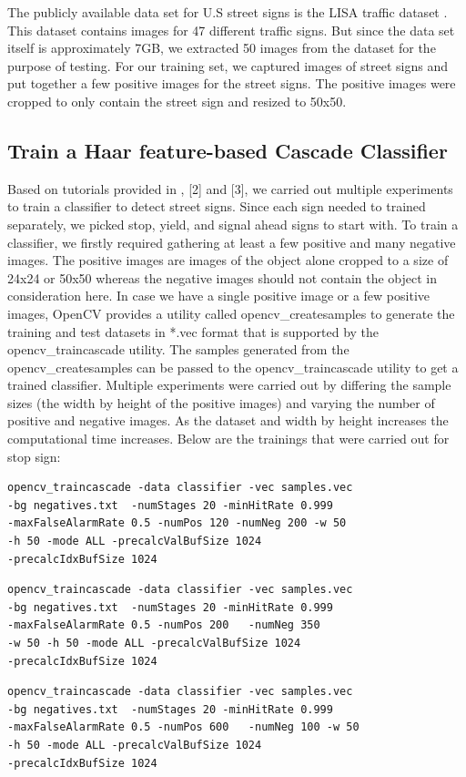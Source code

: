 \documentclass[9pt,twocolumn,twoside]{../../styles/osajnl}
\begin{document}
The publicly available data set for U.S street signs is the LISA traffic dataset \cite{paper-lisadataset}. This dataset contains images for 47 different traffic signs. But since the data set itself is approximately 7GB, we extracted 50 images from the dataset for the purpose of testing. For our training set, we captured images of street signs and put together a few positive images for the street signs. The positive images were cropped to only contain the street sign and resized to 50x50.

\subsection{Train a Haar feature-based Cascade Classifier}

Based on tutorials provided in \cite{www-coding-robin}, [2] and [3], we carried out multiple experiments to train a classifier to detect street signs. Since each sign needed to trained separately, we picked stop, yield, and signal ahead signs to start with. To train a classifier, we firstly required gathering at least a few positive and many negative images. The positive images are images of the object alone cropped to a size of 24x24 or 50x50 whereas the negative images should not contain the object in consideration here. In case we have a single positive image or a few positive images, OpenCV provides a utility called opencv\_createsamples to generate the training and test datasets in *.vec format that is supported by the opencv\_traincascade utility. The samples generated from the opencv\_createsamples can be passed to the opencv\_traincascade utility to get a trained classifier.   
Multiple experiments were carried out by differing the sample sizes (the width by height of the positive images) and varying the number of positive and negative images. As the dataset and width by height increases the computational time increases. Below are the trainings that were carried out for stop sign:

\begin{verbatim}
opencv_traincascade -data classifier -vec samples.vec 
-bg negatives.txt  -numStages 20 -minHitRate 0.999 
-maxFalseAlarmRate 0.5 -numPos 120 -numNeg 200 -w 50
-h 50 -mode ALL -precalcValBufSize 1024
-precalcIdxBufSize 1024
\end{verbatim}
\begin{verbatim}
opencv_traincascade -data classifier -vec samples.vec 
-bg negatives.txt  -numStages 20 -minHitRate 0.999 
-maxFalseAlarmRate 0.5 -numPos 200   -numNeg 350 
-w 50 -h 50 -mode ALL -precalcValBufSize 1024 
-precalcIdxBufSize 1024
\end{verbatim}
\begin{verbatim}
opencv_traincascade -data classifier -vec samples.vec
-bg negatives.txt  -numStages 20 -minHitRate 0.999 
-maxFalseAlarmRate 0.5 -numPos 600   -numNeg 100 -w 50 
-h 50 -mode ALL -precalcValBufSize 1024 
-precalcIdxBufSize 1024
\end{verbatim}
\end{document}
